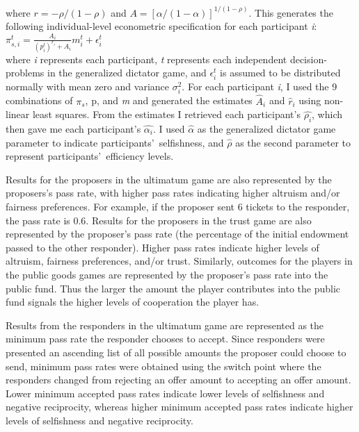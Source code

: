 \documentclass[12pt]{article}
\begin{document}
 \noindent
where \(r=-\rho / (1-\rho) \) and \(A=[\alpha / (1-\alpha)]^{1/(1-\rho)} \). This generates the following individual-level econometric specification for each participant \textit{i}: \\
 
\( \pi^{t}_{s,i} = \frac{A_{i}}{(p^{t}_{i})^{r_{i}} + A_{i}}m^{t}_{i} + \epsilon^{t}_{i}\) \\
 
\noindent
where \textit{i} represents each participant, \textit{t} represents each independent decision-problems in the generalized dictator game, and \( \epsilon^{t}_{i} \) is assumed to be distributed normally with mean zero and variance \(\sigma^{2}_{i}\). For each participant \textit{i}, I used the 9 combinations of \(\pi_{s}\), p, and \textit{m} and generated the estimates  \( \hat{A}_{i} \) and \( \hat{r}_{i} \) using non-linear least squares. From the estimates I retrieved each participant\rq s \( \hat{\rho_{i}}\), which then gave me each participant\rq s \( \hat{\alpha_{i}} \). I used \(\hat{\alpha}\) as the generalized dictator game parameter to indicate participants\rq \ selfishness, and \(\hat{\rho}\) as the second parameter to represent participants\rq \ efficiency levels.

Results for the proposers in the ultimatum game are also represented by the proposers\rq s pass rate, with higher pass rates indicating higher altruism and/or fairness preferences. For example, if the proposer sent 6 tickets to the responder, the pass rate is 0.6. Results for the proposers in the trust game are also represented by the proposer\rq s pass rate (the percentage of the initial endowment passed to the other responder). Higher pass rates indicate higher levels of altruism, fairness preferences, and/or trust. Similarly, outcomes for the players in the public goods games are represented by the proposer\rq s pass rate into the public fund. Thus the larger the amount the player contributes into the public fund signals the higher levels of cooperation the player has. 

Results from the responders in the ultimatum game are represented as the minimum pass rate the responder chooses to accept. Since responders were presented an ascending list of all possible amounts the proposer could choose to send, minimum pass rates were obtained using the switch point where the responders changed from rejecting an offer amount to accepting an offer amount. Lower minimum accepted pass rates indicate lower levels of selfishness and negative reciprocity, whereas higher minimum accepted pass rates indicate higher levels of selfishness and negative reciprocity.
\end{document}

